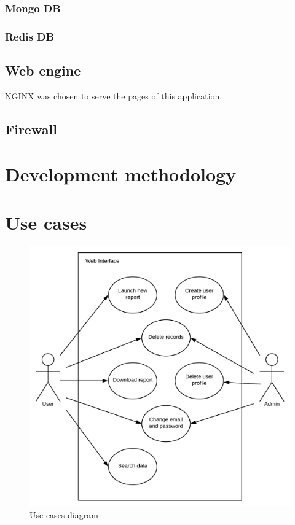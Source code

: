 \subsubsection{Mongo DB}

\subsubsection{Redis DB}

\subsection{Web engine}
NGINX was chosen to serve the pages of this application.

\subsection{Firewall}

\section{Development methodology}

\section{Use cases}

\begin{figure}[h!]
\centering
\includegraphics[scale=0.4]{imgs/UseCasesDiag.pdf}
\caption{Use cases diagram}
\label{fig:sysarch}
\end{figure}

